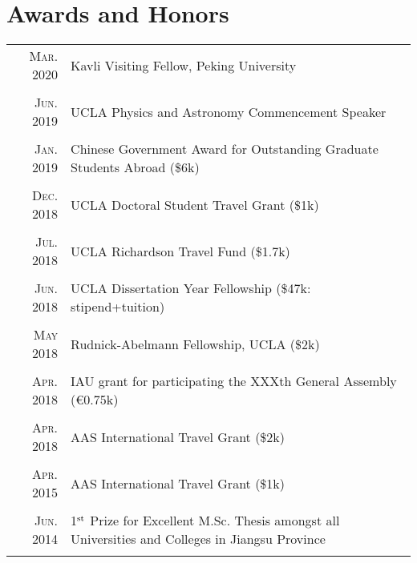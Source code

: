 \documentclass[letterpaper,10pt]{article}
\newcommand{\narrow}{-1.8ex}
\newcommand{\textwrap}{5.8in}       %
\begin{document}
\section{Awards and Honors}

\vspace*{-.5em}
\begin{longtable}{r|p{\textwrap}}
    \textsc{Mar. 2020} & Kavli Visiting Fellow, Peking University \\
    \multicolumn{2}{c}{} \\[\narrow]
    \textsc{Jun. 2019} & UCLA Physics and Astronomy Commencement Speaker  \\
    \multicolumn{2}{c}{} \\[\narrow]
    \textsc{Jan. 2019} & Chinese Government Award for Outstanding Graduate Students Abroad (\$6k)   \\
    \multicolumn{2}{c}{} \\[\narrow]
    \textsc{Dec. 2018} & UCLA Doctoral Student Travel Grant (\$1k)   \\
    \multicolumn{2}{c}{} \\[\narrow]
    \textsc{Jul. 2018} & UCLA Richardson Travel Fund (\$1.7k)   \\
    \multicolumn{2}{c}{} \\[\narrow]
    \textsc{Jun. 2018} & UCLA Dissertation Year Fellowship (\$47k: stipend+tuition)    \\
    \multicolumn{2}{c}{} \\[\narrow]
    \textsc{May 2018} & Rudnick-Abelmann Fellowship, UCLA (\$2k)      \\
    \multicolumn{2}{c}{} \\[\narrow]
    \textsc{Apr. 2018} & IAU grant for participating the XXXth General Assembly (\euro0.75k)  \\
    \multicolumn{2}{c}{} \\[\narrow]
    \textsc{Apr. 2018} & AAS International Travel Grant (\$2k)    \\
    \multicolumn{2}{c}{} \\[\narrow]
    \textsc{Apr. 2015} & AAS International Travel Grant (\$1k)    \\
    \multicolumn{2}{c}{} \\[\narrow]
    \textsc{Jun. 2014} & 1$^{\rm st}$ Prize for Excellent M.Sc. Thesis amongst all Universities and Colleges in Jiangsu Province \\
    \multicolumn{2}{c}{} \\[\narrow]

\end{longtable}
\end{document}
